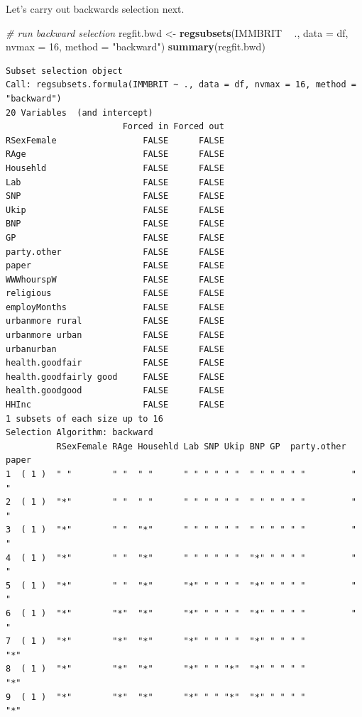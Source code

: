 \documentclass[]{article}
\newenvironment{Shaded}{\begin{snugshade}}{\end{snugshade}}
\newcommand{\CommentTok}[1]{\textcolor[rgb]{0.56,0.35,0.01}{\textit{#1}}}
\newcommand{\DataTypeTok}[1]{\textcolor[rgb]{0.13,0.29,0.53}{#1}}
\newcommand{\DecValTok}[1]{\textcolor[rgb]{0.00,0.00,0.81}{#1}}
\newcommand{\KeywordTok}[1]{\textcolor[rgb]{0.13,0.29,0.53}{\textbf{#1}}}
\newcommand{\NormalTok}[1]{#1}
\newcommand{\OperatorTok}[1]{\textcolor[rgb]{0.81,0.36,0.00}{\textbf{#1}}}
\newcommand{\StringTok}[1]{\textcolor[rgb]{0.31,0.60,0.02}{#1}}
\begin{document}
Let's carry out backwards selection next.

\begin{Shaded}
\begin{Highlighting}[]
\CommentTok{# run backward selection}
\NormalTok{regfit.bwd <-}\StringTok{ }\KeywordTok{regsubsets}\NormalTok{(IMMBRIT }\OperatorTok{~}\StringTok{ }\NormalTok{., }\DataTypeTok{data =}\NormalTok{ df, }\DataTypeTok{nvmax =} \DecValTok{16}\NormalTok{, }\DataTypeTok{method =} \StringTok{"backward"}\NormalTok{)}
\KeywordTok{summary}\NormalTok{(regfit.bwd)}
\end{Highlighting}
\end{Shaded}

\begin{verbatim}
Subset selection object
Call: regsubsets.formula(IMMBRIT ~ ., data = df, nvmax = 16, method = "backward")
20 Variables  (and intercept)
                       Forced in Forced out
RSexFemale                 FALSE      FALSE
RAge                       FALSE      FALSE
Househld                   FALSE      FALSE
Lab                        FALSE      FALSE
SNP                        FALSE      FALSE
Ukip                       FALSE      FALSE
BNP                        FALSE      FALSE
GP                         FALSE      FALSE
party.other                FALSE      FALSE
paper                      FALSE      FALSE
WWWhourspW                 FALSE      FALSE
religious                  FALSE      FALSE
employMonths               FALSE      FALSE
urbanmore rural            FALSE      FALSE
urbanmore urban            FALSE      FALSE
urbanurban                 FALSE      FALSE
health.goodfair            FALSE      FALSE
health.goodfairly good     FALSE      FALSE
health.goodgood            FALSE      FALSE
HHInc                      FALSE      FALSE
1 subsets of each size up to 16
Selection Algorithm: backward
          RSexFemale RAge Househld Lab SNP Ukip BNP GP  party.other paper
1  ( 1 )  " "        " "  " "      " " " " " "  " " " " " "         " "  
2  ( 1 )  "*"        " "  " "      " " " " " "  " " " " " "         " "  
3  ( 1 )  "*"        " "  "*"      " " " " " "  " " " " " "         " "  
4  ( 1 )  "*"        " "  "*"      " " " " " "  "*" " " " "         " "  
5  ( 1 )  "*"        " "  "*"      "*" " " " "  "*" " " " "         " "  
6  ( 1 )  "*"        "*"  "*"      "*" " " " "  "*" " " " "         " "  
7  ( 1 )  "*"        "*"  "*"      "*" " " " "  "*" " " " "         "*"  
8  ( 1 )  "*"        "*"  "*"      "*" " " "*"  "*" " " " "         "*"  
9  ( 1 )  "*"        "*"  "*"      "*" " " "*"  "*" " " " "         "*"  

\end{verbatim}
\end{document}
